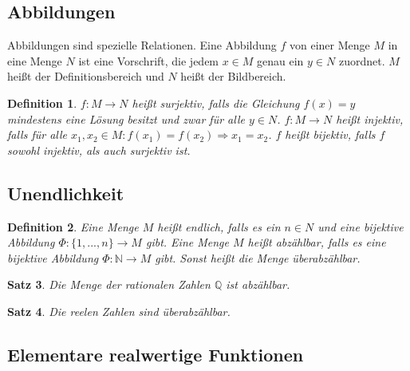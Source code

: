 \documentclass[12pt,a4paper]{article}%
\newtheorem{satz}{Satz}[section]
\newtheorem{definition}[satz]{Definition}
\numberwithin{equation}{section}
\newcommand{\N}{\mathbb{N}}
\newcommand{\Q}{\mathbb{Q}}
\numberwithin{equation}{subsection}
\begin{document}
	\subsection{Abbildungen}
	Abbildungen sind spezielle Relationen. Eine Abbildung $f$ von einer Menge $M$ in eine Menge $N$ ist eine Vorschrift, die jedem $x \in M$ genau ein $y \in N$ zuordnet. $M$ heißt der Definitionsbereich und $N$ heißt der Bildbereich. 
	\begin{definition}
	  $f: M\rightarrow N$ heißt surjektiv, falls die Gleichung $f(x) = y$ mindestens eine Lösung besitzt und zwar für alle $y \in N$.\newline
	  $f:M\rightarrow N$ heißt injektiv, falls für alle $x_1, x_2 \in M: f(x_1) = f(x_2) \Rightarrow x_1 = x_2$.\newline
	  $f$ heißt bijektiv, falls $f$ sowohl injektiv, als auch surjektiv ist.
	\end{definition}
	\subsection{Unendlichkeit}
	\begin{definition}
	  Eine Menge $M$ heißt endlich, falls es ein $n \in N$ und eine bijektive Abbildung $\Phi: \lbrace 1,...,n\rbrace \rightarrow M$ gibt. Eine Menge $M$ heißt abzählbar, falls es eine bijektive Abbildung $\Phi: \N \rightarrow M$ gibt. Sonst heißt die Menge überabzählbar.
	\end{definition}
	\begin{satz}
	  Die Menge der rationalen Zahlen $\Q$ ist abzählbar.
	\end{satz}
	\begin{satz}
	  Die reelen Zahlen sind überabzählbar.
	\end{satz}
	
	\subsection{Elementare realwertige Funktionen}
\end{document}
